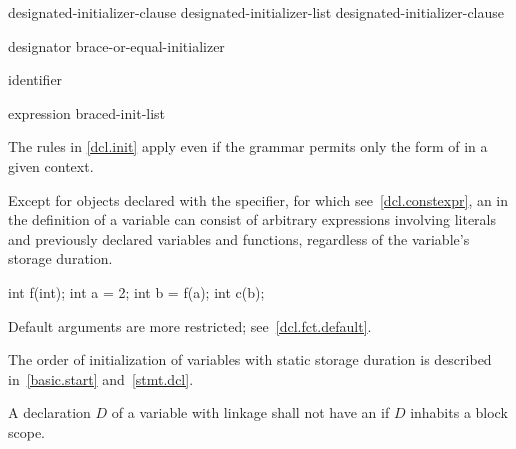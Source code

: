 \begin{bnf}
\br
    designated-initializer-clause\br
    designated-initializer-list \terminal{,} designated-initializer-clause
\end{bnf}

\begin{bnf}
\br
    designator brace-or-equal-initializer
\end{bnf}

\begin{bnf}
\br
     identifier
\end{bnf}

\begin{bnf}
\br
    expression\br
    braced-init-list
\end{bnf}

\begin{note}
The rules in \ref{dcl.init} apply even if the grammar permits only
the  form
of  in a given context.
\end{note}

\pnum
Except for objects declared with the  specifier, for which see~\ref{dcl.constexpr},
an  in the definition of a variable can consist of
arbitrary expressions involving literals and previously declared
variables and functions,
regardless of the variable's storage duration.
\begin{example}
\begin{codeblock}
int f(int);
int a = 2;
int b = f(a);
int c(b);
\end{codeblock}
\end{example}

\pnum
\begin{note}
Default arguments are more restricted; see~\ref{dcl.fct.default}.
\end{note}

\pnum
\begin{note}
The order of initialization of variables with static storage duration is described in~\ref{basic.start}
and~\ref{stmt.dcl}.
\end{note}

\pnum
A declaration $D$ of a variable with linkage
shall not have an 
if $D$ inhabits a block scope.

